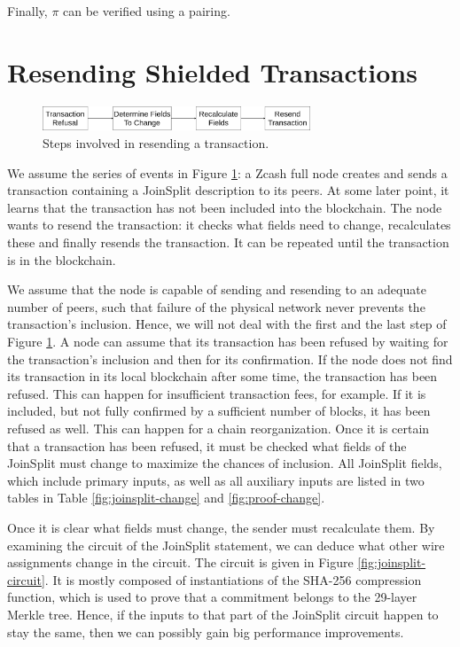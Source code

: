 \documentclass{article}
\begin{document}
Finally, $\pi$ can be verified using a pairing.

\section{Resending Shielded Transactions}

\begin{figure}[t]
\includegraphics[width=8cm]{images/timeline.png}
\caption{Steps involved in resending a transaction.} \label{fig:resend-steps}
\centering
\end{figure}

We assume the series of events in Figure \ref{fig:resend-steps}: a Zcash full node creates and sends a transaction containing a JoinSplit description to its peers.
At some later point, it learns that the transaction has not been included into the blockchain.
The node wants to resend the transaction: it checks what fields need to change, recalculates these and finally resends the transaction.
It can be repeated until the transaction is in the blockchain.

We assume that the node is capable of sending and resending to an adequate number of peers, such that failure of the physical network never prevents the transaction's inclusion.
Hence, we will not deal with the first and the last step of Figure \ref{fig:resend-steps}.
A node can assume that its transaction has been refused by waiting for the transaction's inclusion and then for its confirmation.
If the node does not find its transaction in its local blockchain after some time, the transaction has been refused.
This can happen for insufficient transaction fees, for example.
If it is included, but not fully confirmed by a sufficient number of blocks, it has been refused as well.
This can happen for a chain reorganization.
Once it is certain that a transaction has been refused, it must be checked what fields of the JoinSplit must change to maximize the chances of inclusion.
All JoinSplit fields, which include primary inputs, as well as all auxiliary inputs are listed in two tables in Table \ref{fig:joinsplit-change} and \ref{fig:proof-change}.

Once it is clear what fields must change, the sender must recalculate them.
By examining the circuit of the JoinSplit statement, we can deduce what other wire assignments change in the circuit.
The circuit is given in Figure \ref{fig:joinsplit-circuit}.
It is mostly composed of instantiations of the SHA-256 compression function, which is used to prove that a commitment belongs to the 29-layer Merkle tree.
Hence, if the inputs to that part of the JoinSplit circuit happen to stay the same, then we can possibly gain big performance improvements.
\end{document}
